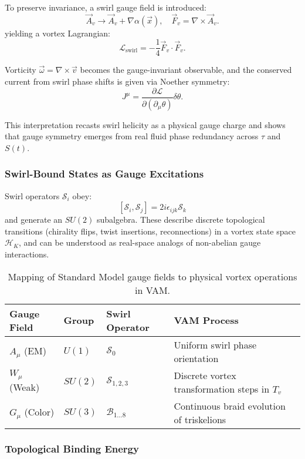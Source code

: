 To preserve invariance, a swirl gauge field is introduced:
\[
\vec{A}_v \rightarrow \vec{A}_v + \nabla \alpha(\vec{x}), \quad \vec{F}_v = \nabla \times \vec{A}_v.
\]
yielding a vortex Lagrangian:
\[
\mathcal{L}_\text{swirl} = -\frac{1}{4} \vec{F}_v \cdot \vec{F}_v.
\]

Vorticity \( \vec{\omega} = \nabla \times \vec{v} \) becomes the gauge-invariant observable, and the conserved current from swirl phase shifts is given via Noether symmetry:
\[
J^\mu = \frac{\partial \mathcal{L}}{\partial(\partial_\mu \theta)} \delta \theta.
\]

This interpretation recasts swirl helicity as a physical gauge charge and shows that gauge symmetry emerges from real fluid phase redundancy across $\tau$ and $S(t)$.

\subsubsection*{Swirl-Bound States as Gauge Excitations}

Swirl operators \( \mathcal{S}_i \) obey:
\[
[ \mathcal{S}_i, \mathcal{S}_j ] = 2i \epsilon_{ijk} \mathcal{S}_k
\]
and generate an $SU(2)$ subalgebra. These describe discrete topological transitions (chirality flips, twist insertions, reconnections) in a vortex state space \( \mathcal{H}_K \), and can be understood as real-space analogs of non-abelian gauge interactions.

\begin{table}[H]
\centering
\footnotesize
\renewcommand{\arraystretch}{1.4}
\begin{tabular}{|l|l|l|l|}
\hline
\textbf{Gauge Field} & \textbf{Group} & \textbf{Swirl Operator} & \textbf{VAM Process} \\
\hline
$A_\mu$ (EM) & $U(1)$ & $\mathcal{S}_0$ & Uniform swirl phase orientation \\
$W_\mu$ (Weak) & $SU(2)$ & $\mathcal{S}_{1,2,3}$ & Discrete vortex transformation steps in \( T_v \) \\
$G_\mu$ (Color) & $SU(3)$ & $\mathcal{B}_{1\dots8}$ & Continuous braid evolution of triskelions \\
\hline
\end{tabular}
\caption{Mapping of Standard Model gauge fields to physical vortex operations in VAM.}
\end{table}

\subsubsection*{Topological Binding Energy}

